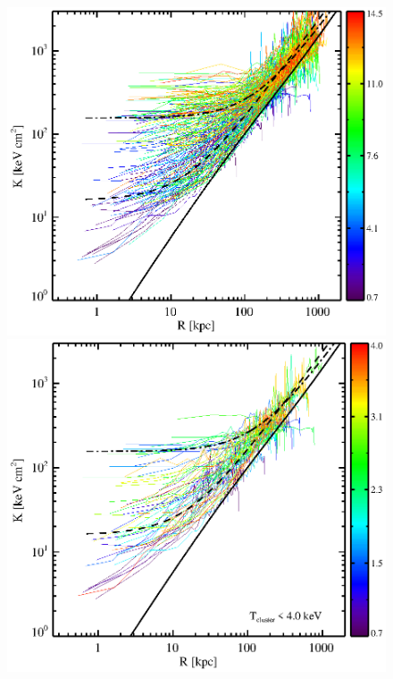 \begin{center}
  \begin{figure}[htp]
    \begin{minipage}[htp]{0.5\linewidth}
      \includegraphics*[width=\textwidth, trim=28mm 7mm 30mm 17mm, clip]{splots_allt}
    \end{minipage}
    \begin{minipage}[htp]{0.5\linewidth}
      \includegraphics*[width=\textwidth, trim=28mm 7mm 30mm 17mm, clip]{splots_tle4}

\end{minipage}
\end{figure}
\end{center}
